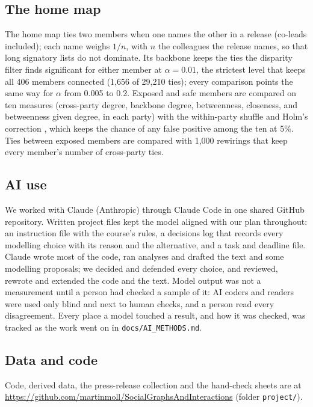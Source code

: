 \documentclass[9pt,twocolumn,twoside]{pnas-new}
\begin{document}
{\subsection*{The home map}
The home map ties two members when one names the other in a release (co-leads included); each name weighs $1/n$, with
$n$ the colleagues the release names, so that long signatory lists do not dominate. Its backbone keeps the ties the
disparity filter \cite{serrano2009} finds significant for either member at $\alpha = 0.01$, the strictest level that
keeps all 406 members connected (1,656 of 29,210 ties); every comparison points the same way for $\alpha$ from 0.005
to 0.2. Exposed and safe members are compared on ten measures (cross-party degree, backbone degree, betweenness,
closeness, and betweenness given degree, in each party) with the within-party shuffle and Holm's correction
\cite{holm1979}, which keeps the chance of any false positive among the ten at 5\%. Ties between exposed members are
compared with 1,000 rewirings that keep every member's number of cross-party ties.

\subsection*{AI use}
We worked with Claude (Anthropic) through Claude Code in one shared GitHub repository. Written project files kept the
model aligned with our plan throughout: an instruction file with the course's rules, a decisions log that records
every modelling choice with its reason and the alternative, and a task and deadline file. Claude wrote most of the
code, ran analyses and drafted the text and some modelling proposals; we decided and defended every choice, and
reviewed, rewrote and extended the code and the text. Model output was not a measurement until a person had checked a
sample of it: AI coders and readers were used only blind and next to human checks, and a person read every
disagreement. Every place a model touched a result, and how it was checked, was tracked as the work went on in
\texttt{docs/AI\_METHODS.md}.

\subsection*{Data and code}
Code, derived data, the press-release collection and the hand-check sheets are at
\url{https://github.com/martinmoll/SocialGraphsAndInteractions} (folder \texttt{project/}).
}

\showmatmethods{}



\clearpage
\end{document}
